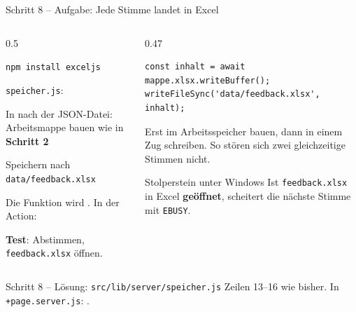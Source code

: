 \begin{frame}[fragile]{Schritt 8 -- Aufgabe: Jede Stimme landet in Excel}
  \footnotesize
  \begin{columns}[onlytextwidth,t]
    \begin{column}{0.5\textwidth}
      \begin{tugenumerate}
        \item \texttt{npm install exceljs}
        \item \texttt{speicher.js}: 
        \item In  nach der JSON-Datei:
              Arbeitsmappe bauen wie in \textbf{Schritt 2}
        \item Speichern nach \texttt{data/feedback.xlsx}
        \item Die Funktion wird . In der Action:
      \end{tugenumerate}
      \textbf{Test}: Abstimmen, \texttt{feedback.xlsx} öffnen.
    \end{column}
    \begin{column}{0.47\textwidth}
\begin{lstlisting}[style=jssm,numbers=none]
const inhalt = await mappe.xlsx.writeBuffer();
writeFileSync('data/feedback.xlsx', inhalt);
\end{lstlisting}
      Erst im Arbeitsspeicher bauen, dann in einem Zug schreiben.
      So stören sich zwei gleichzeitige Stimmen nicht.
      \begin{alertblock}{Stolperstein unter Windows}
        \footnotesize Ist \texttt{feedback.xlsx} in Excel \textbf{geöffnet},
        scheitert die nächste Stimme mit \texttt{EBUSY}.
      \end{alertblock}
    \end{column}
  \end{columns}
\end{frame}

\begin{loesung}
\begin{frame}[fragile]{Schritt 8 -- Lösung: \texttt{src/lib/server/speicher.js}}
  {\scriptsize Zeilen 13--16 wie bisher. In \texttt{+page.server.js}: .}
\end{frame}
\end{loesung}

